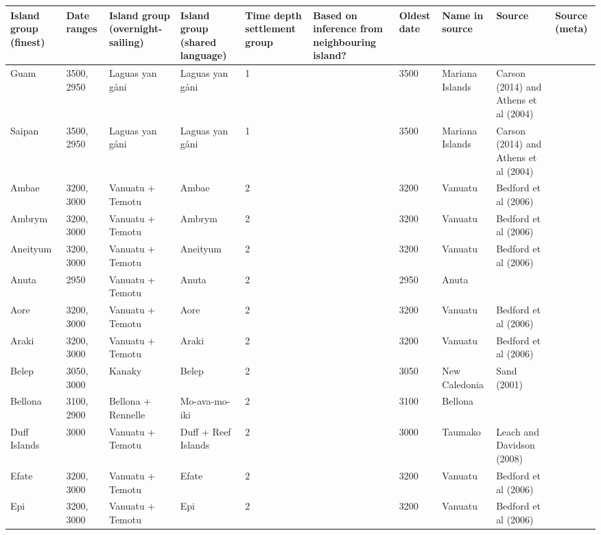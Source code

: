 \begin{longtable}{p{2cm}p{2cm}p{2cm}p{2cm}p{2cm}p{2cm}p{2cm}p{2cm}p{2cm}p{2cm}}
  \toprule
Island group (finest) & Date ranges & Island group (overnight-sailing) & Island group (shared language) & Time depth settlement group & Based on inference from neighbouring island? & Oldest date & Name in source & Source & Source (meta) \\ 
  \midrule
Guam & 3500, 2950 & Laguas yan gåni & Laguas yan gåni & 1 &  & 3500 & Mariana Islands & Carson (2014) and Athens et al (2004) & \citet{rieth_cochrane_2018} \\ 
  Saipan & 3500, 2950 & Laguas yan gåni & Laguas yan gåni & 1 &  & 3500 & Mariana Islands & Carson (2014) and Athens et al (2004) & \citet{rieth_cochrane_2018} \\ 
  Ambae & 3200, 3000 & Vanuatu + Temotu & Ambae & 2 &  & 3200 & Vanuatu & Bedford et al (2006) & \citet{rieth_cochrane_2018} \\ 
  Ambrym & 3200, 3000 & Vanuatu + Temotu & Ambrym & 2 &  & 3200 & Vanuatu & Bedford et al (2006) & \citet{rieth_cochrane_2018} \\ 
  Aneityum & 3200, 3000 & Vanuatu + Temotu & Aneityum & 2 &  & 3200 & Vanuatu & Bedford et al (2006) & \citet{rieth_cochrane_2018} \\ 
  Anuta & 2950 & Vanuatu + Temotu & Anuta & 2 &  & 2950 & Anuta & \citet{carson2012recent} &  \\ 
  Aore & 3200, 3000 & Vanuatu + Temotu & Aore & 2 &  & 3200 & Vanuatu & Bedford et al (2006) & \citet{rieth_cochrane_2018} \\ 
  Araki & 3200, 3000 & Vanuatu + Temotu & Araki & 2 &  & 3200 & Vanuatu & Bedford et al (2006) & \citet{rieth_cochrane_2018} \\ 
  Belep & 3050, 3000 & Kanaky & Belep & 2 &  & 3050 & New Caledonia & Sand (2001) & \citet{rieth_cochrane_2018} \\ 
  Bellona & 3100, 2900 & Bellona + Rennelle & Mo-ava-mo-iki & 2 &  & 3100 & Bellona & \citet{carson2012recent} &  \\ 
  Duff Islands & 3000 & Vanuatu + Temotu & Duff + Reef Islands & 2 &  & 3000 & Taumako & Leach and Davidson (2008) & \citet{carson2012recent} \\ 
  Efate & 3200, 3000 & Vanuatu + Temotu & Efate & 2 &  & 3200 & Vanuatu & Bedford et al (2006) & \citet{rieth_cochrane_2018} \\ 
  Epi & 3200, 3000 & Vanuatu + Temotu & Epi & 2 &  & 3200 & Vanuatu & Bedford et al (2006) & \citet{rieth_cochrane_2018} \\ 

\end{longtable}
